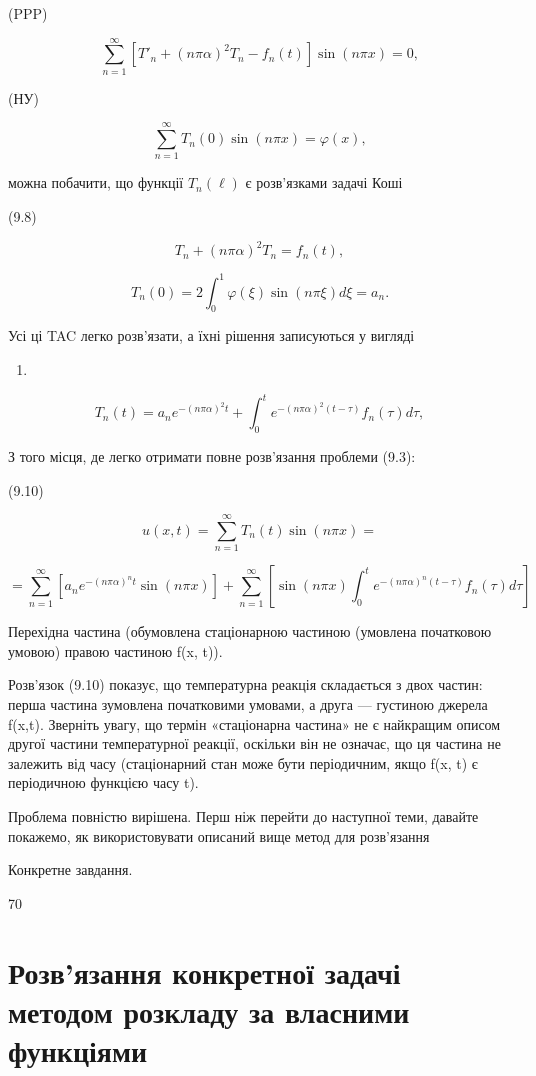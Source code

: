 \documentclass[
  ukrainian,
]{article}
\providecommand{\tightlist}{%
  \setlength{\itemsep}{0pt}\setlength{\parskip}{0pt}}
\begin{document}
(PPP)

\[
\sum_{n=1}^{\infty} [T'_n + (n\pi\alpha)^2 T_n - f_n(t)] \sin(n\pi x) = 0,
\]

(НУ)

\[
\sum_{n=1}^{\infty} T_n(0) \sin(n\pi x) = \varphi(x),
\]

можна побачити, що функції \(T_n(\ell)\) є розв'язками задачі Коші

(9.8)

\[
T_{n} + (n\pi\alpha)^{2} T_{n} = f_{n}(t),
\]

\[
T_{n}(0) = 2 \int_{0}^{1} \varphi(\xi) \sin(n\pi\xi) d\xi = a_{n}.
\]

Усі ці TAC легко розв'язати, а їхні рішення записуються у вигляді

\begin{enumerate}
\def\labelenumi{(\arabic{enumi})}
\setcounter{enumi}{98}
\tightlist
\item
\end{enumerate}

\[
T_n(t) = a_n e^{-(n\pi\alpha)^2 t} + \int_0^t e^{-(n\pi\alpha)^2 (t-\tau)} f_n(\tau) d\tau,
\]

З того місця, де легко отримати повне розв'язання проблеми (9.3):

(9.10)

\[
u(x, t) = \sum_{n=1}^{\infty} T_n(t) \sin(n\pi x) =
\]

\[
= \sum_{n=1}^{\infty} \left[ a_n e^{-(n\pi\alpha)^n t} \sin(n\pi x) \right] + \sum_{n=1}^{\infty} \left[ \sin(n\pi x) \int_0^t e^{-(n\pi\alpha)^n (t-\tau)} f_n(\tau) d\tau \right]
\]

Перехідна частина (обумовлена стаціонарною частиною (умовлена початковою
умовою) правою частиною f(x, t)).

Розв'язок (9.10) показує, що температурна реакція складається з двох
частин: перша частина зумовлена початковими умовами, а друга ---
густиною джерела f(x,t). Зверніть увагу, що термін «стаціонарна частина»
не є найкращим описом другої частини температурної реакції, оскільки він
не означає, що ця частина не залежить від часу (стаціонарний стан може
бути періодичним, якщо f(x, t) є періодичною функцією часу t).

Проблема повністю вирішена. Перш ніж перейти до наступної теми, давайте
покажемо, як використовувати описаний вище метод для розв'язання

Конкретне завдання.

70

\section{Розв'язання конкретної задачі методом розкладу за власними
функціями}\label{ux440ux43eux437ux432ux44fux437ux430ux43dux43dux44f-ux43aux43eux43dux43aux440ux435ux442ux43dux43eux457-ux437ux430ux434ux430ux447ux456-ux43cux435ux442ux43eux434ux43eux43c-ux440ux43eux437ux43aux43bux430ux434ux443-ux437ux430-ux432ux43bux430ux441ux43dux438ux43cux438-ux444ux443ux43dux43aux446ux456ux44fux43cux438}
\end{document}
